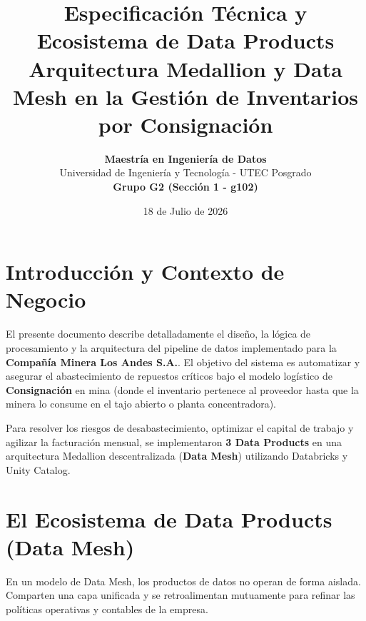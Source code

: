 \documentclass[11pt,a4paper]{article}
\title{\textbf{Especificación Técnica y Ecosistema de Data Products}\\
\large Arquitectura Medallion y Data Mesh en la Gestión de Inventarios por Consignación}
\author{\textbf{Maestría en Ingeniería de Datos} \\ Universidad de Ingeniería y Tecnología - UTEC Posgrado \\ \textbf{Grupo G2 (Sección 1 - g102)}}
\date{18 de Julio de 2026}
\begin{document}
\maketitle
\tableofcontents
\newpage

\section{Introducción y Contexto de Negocio}
El presente documento describe detalladamente el diseño, la lógica de procesamiento y la arquitectura del pipeline de datos implementado para la \textbf{Compañía Minera Los Andes S.A.}. El objetivo del sistema es automatizar y asegurar el abastecimiento de repuestos críticos bajo el modelo logístico de \textbf{Consignación} en mina (donde el inventario pertenece al proveedor hasta que la minera lo consume en el tajo abierto o planta concentradora).

Para resolver los riesgos de desabastecimiento, optimizar el capital de trabajo y agilizar la facturación mensual, se implementaron \textbf{3 Data Products} en una arquitectura Medallion descentralizada (\textbf{Data Mesh}) utilizando Databricks y Unity Catalog.

\newpage
\section{El Ecosistema de Data Products (Data Mesh)}
En un modelo de Data Mesh, los productos de datos no operan de forma aislada. Comparten una capa unificada y se retroalimentan mutuamente para refinar las políticas operativas y contables de la empresa.
\end{document}
